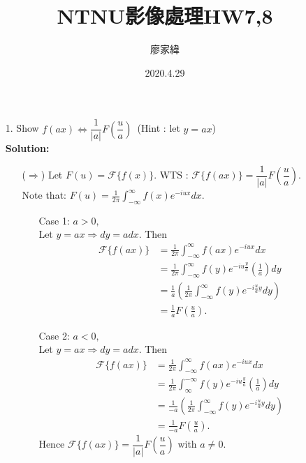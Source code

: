 \documentclass[12pt,a4paper]{article}
\title{NTNU影像處理HW7,8}
\author{廖家緯}
\date{2020.4.29}
\begin{document}
\maketitle
\fontsize{12pt}{30pt}\selectfont
\setlength{\baselineskip}{25pt}

\pagestyle{fancy}
\lhead{}
\chead{}
\rhead{}
\lfoot{}
\cfoot{\thepage}
\rfoot{}
\renewcommand{\headrulewidth}{0pt} %
\renewcommand{\footrulewidth}{0pt} %




\begin{enumerate}
\item[1.]	
Show $f(ax) \Longleftrightarrow
\dfrac{1}{|a|}F\left(\dfrac{u}{a}\right)$
\,(Hint : let $y=ax$)\\
{\bf Solution:}
\begin{enumerate}
\item[($\Longrightarrow$)]
Let $F(u)=\mathcal{F}\{f(x)\}$.
WTS : $\mathcal{F}\{f(ax)\}
=\dfrac{1}{|a|}F\left(\dfrac{u}{a}\right)$.\\
Note that:
$F(u)= \displaystyle \frac{1}{2\pi}
\int_{-\infty}^{\infty}f(x) e^{-iux} dx$.
\begin{enumerate}
\item[Case 1:]
$a>0,$\\
Let $y=a x \Longrightarrow dy=adx$. Then
\begin{align*}
\displaystyle \mathcal{F}\{f(ax)\}
&=\frac{1}{2\pi} \int_{-\infty}^{\infty}
f(ax) e^{-iux} dx\\
&=\frac{1}{2\pi} \int_{-\infty}^{\infty}
f(y) e^{-iu\frac{y}{a}}\left(\frac{1}{a}\right) dy\\
&=\frac{1}{a}\left(
\frac{1}{2\pi} \int_{-\infty}^{\infty}
f(y) e^{-i\frac{u}{a}y}dy\right)\\
&=\frac{1}{a}F\left(\frac{u}{a}\right).
\end{align*}
\item[Case 2:]
$a<0,$\\
Let $y=a x \Longrightarrow dy=adx$. Then
\begin{align*}
\displaystyle \mathcal{F}\{f(ax)\}
&=\frac{1}{2\pi} \int_{-\infty}^{\infty}
f(ax) e^{-iux} dx\\
&=\frac{1}{2\pi} \int_{\infty}^{-\infty}
f(y) e^{-iu\frac{y}{a}}\left(\frac{1}{a}\right) dy\\
&=\frac{1}{-a}\left(
\frac{1}{2\pi} \int_{-\infty}^{\infty}
f(y) e^{-i\frac{u}{a}y}dy\right)\\
&=\frac{1}{-a}F\left(\frac{u}{a}\right).
\end{align*}
Hence $\mathcal{F}\{f(ax)\}
=\dfrac{1}{|a|}F\left(\dfrac{u}{a}\right)$
with $a \neq 0$.\\


\end{enumerate}
\end{enumerate}
\end{enumerate}
\end{document}
